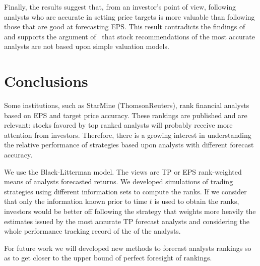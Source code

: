 \documentclass[a4paper,12pt,openright,notitlepage]{report}\usepackage[]{graphicx}\usepackage[]{color}
\begin{document}


Finally, the results suggest that, from an investor's point of view, following analysts who are accurate in setting price targets is more valuable than following those that are good at forecasting EPS.  This result contradicts the findings of~\cite{bradshaw2004} and supports the argument of~\cite{simon2011} that stock recommendations of the most accurate analysts are not based upon simple valuation models.

\section{Conclusions}
\label{ch1-sec:conclusion}

Some institutions, such as StarMine (ThomsonReuters), rank financial analysts based on EPS and target price accuracy. These rankings are published and are relevant: stocks favored by top ranked analysts will probably receive more attention from investors. Therefore, there is a growing interest in understanding the relative performance of strategies based upon analysts with different forecast accuracy.

We use the Black-Litterman model. The views are TP or EPS rank-weighted means of analysts forecasted returns. We developed simulations of trading strategies using different information sets to compute the ranks. If we consider that only the information known prior to time $t$ is used to obtain the ranks, investors would be better off following the strategy that weights more heavily the estimates issued  by the most accurate TP forecast analysts and considering the whole performance tracking record of the of the analysts.


For future work we will developed new methods to forecast analysts rankings so as to get closer to the upper bound of perfect foresight of rankings.
\processdelayedfloats
\cleardoublepage
\end{document}
